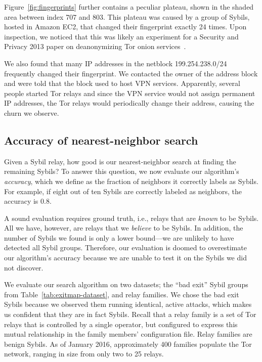 Figure~\ref{fig:fingerprints} further contains a peculiar plateau, shown in the
shaded area between index 707 and 803.  This plateau was caused by a group of
Sybils, hosted in Amazon EC2, that changed their fingerprint exactly 24 times.
Upon inspection, we noticed that this was likely an experiment for a Security
and Privacy 2013 paper on deanonymizing Tor onion services~\cite{Biryukov2013a}.

We also found that many IP addresses in the netblock 199.254.238.0/24
frequently changed their fingerprint.  We contacted the owner of the address
block and were told that the block used to host VPN services.  Apparently,
several people started Tor relays and since the VPN service would not assign
permanent IP addresses, the Tor relays would periodically change their address,
causing the churn we observe.

\subsection{Accuracy of nearest-neighbor search}
\label{sec:accuracy}
Given a Sybil relay, how good is our nearest-neighbor search at finding the
remaining Sybils?  To answer this question, we now evaluate our algorithm's
\emph{accuracy}, which we define as the fraction of neighbors it correctly
labels as Sybils.  For example, if eight out of ten Sybils are correctly
labeled as neighbors, the accuracy is 0.8.

A sound evaluation requires ground truth, i.e., relays that are \emph{known} to
be Sybils.  All we have, however, are relays that we \emph{believe} to be
Sybils.  In addition, the number of Sybils we found is only a lower bound---we
are unlikely to have detected all Sybil groups.  Therefore, our evaluation is
doomed to overestimate our algorithm's accuracy because we are unable to test it
on the Sybils we did not discover.

We evaluate our search algorithm on two datasets; the ``bad exit'' Sybil groups
from Table~\ref{tab:exitmap-dataset}, and relay families.  We chose the bad
exit Sybils because we observed them running identical, active attacks, which
makes us confident that they are in fact Sybils.  Recall that a relay family is
a set of Tor relays that is controlled by a single operator, but configured to
express this mutual relationship in the family members' configuration file.
Relay families are benign Sybils.  As of January 2016, approximately 400
families populate the Tor network, ranging in size from only two to 25 relays.

